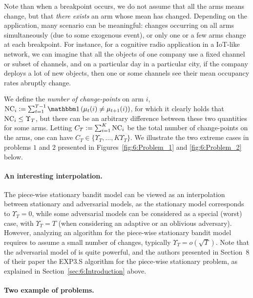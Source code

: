 Note than when a breakpoint occurs, we do not assume that all the arms means  change, but that \emph{there exists} an arm whose mean has changed.
Depending on the application, many scenario can be meaningful: changes occurring on all arms simultaneously (due to some exogenous event), or only one or a few arms change at each breakpoint.
For instance, for a cognitive radio application in a IoT-like network, we can imagine that all the objects of one company use a fixed channel or subset of channels, and on a particular day in a particular city, if the company deploys a lot of new objects, then one or some channels see their mean occupancy rates abruptly change.

We define the \emph{number of change-points} on arm $i$,
$\NCi := \sum_{t=1}^{T-1} \indic\left(\mu_t(i) \neq \mu_{t+1}(i)\right)$,
for which it clearly holds that
$\text{NC}_i \leq \Upsilon_T$, but there can be an arbitrary difference between these two quantities for some arms. Letting $C_T := \sum_{i=1}^K \text{NC}_i$ be the total number of change-points on the arms, one can have $C_T \in \{ \Upsilon_T, \dots, K\Upsilon_T \}$.
We illustrate the two extreme cases in problems $1$ and $2$ presented in Figures~\ref{fig:6:Problem_1} and \ref{fig:6:Problem_2} below.


\paragraph{An interesting interpolation.}
%
The piece-wise stationary bandit model can be viewed as an interpolation between stationary and adversarial models, as the stationary model corresponds to $\Upsilon_T = 0$, while some adversarial models can be considered as a special (worst) case, with $\Upsilon_T = T$ (when considering an adaptive or an oblivious adversary).
However, analyzing an algorithm for the piece-wise stationary bandit model requires to assume a small number of changes, typically $\Upsilon_T = o(\sqrt{T})$.
Note that the adversarial model of \cite{Auer02NonStochastic} is quite powerful, and the authors presented in Section~8 of their paper the EXP3.S algorithm for the piece-wise stationary problem, as explained in Section~\ref{sec:6:Introduction} above.


\paragraph{Two example of problems.}\label{par:6:benchmark1}

